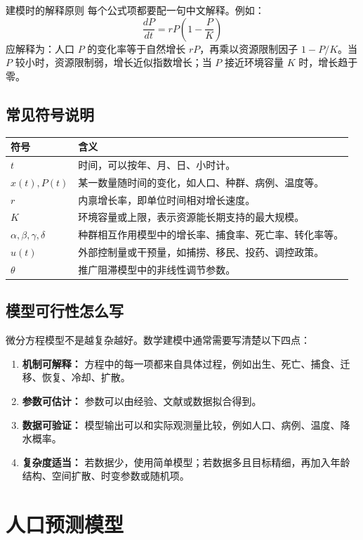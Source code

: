 \documentclass[11pt,a4paper]{ctexart}
\begin{document}
\begin{modelbox}{建模时的解释原则}
每个公式项都要配一句中文解释。例如：
\[
\frac{dP}{dt}=rP\left(1-\frac{P}{K}\right)
\]
应解释为：人口 $P$ 的变化率等于自然增长 $rP$，再乘以资源限制因子 $1-P/K$。当 $P$ 较小时，资源限制弱，增长近似指数增长；当 $P$ 接近环境容量 $K$ 时，增长趋于零。
\end{modelbox}

\subsection{常见符号说明}
\begin{longtable}{>{\centering\arraybackslash}p{2.3cm}p{10.5cm}}
\toprule
符号 & 含义 \\
\midrule
$t$ & 时间，可以按年、月、日、小时计。\\
$x(t),P(t)$ & 某一数量随时间的变化，如人口、种群、病例、温度等。\\
$r$ & 内禀增长率，即单位时间相对增长速度。\\
$K$ & 环境容量或上限，表示资源能长期支持的最大规模。\\
$\alpha,\beta,\gamma,\delta$ & 种群相互作用模型中的增长率、捕食率、死亡率、转化率等。\\
$u(t)$ & 外部控制量或干预量，如捕捞、移民、投药、调控政策。\\
$\theta$ & 推广阻滞模型中的非线性调节参数。\\
\bottomrule
\end{longtable}

\subsection{模型可行性怎么写}
微分方程模型不是越复杂越好。数学建模中通常需要写清楚以下四点：
\begin{enumerate}[itemsep=0.2em]
\item \textbf{机制可解释：} 方程中的每一项都来自具体过程，例如出生、死亡、捕食、迁移、恢复、冷却、扩散。
\item \textbf{参数可估计：} 参数可以由经验、文献或数据拟合得到。
\item \textbf{数据可验证：} 模型输出可以和实际观测量比较，例如人口、病例、温度、降水概率。
\item \textbf{复杂度适当：} 若数据少，使用简单模型；若数据多且目标精细，再加入年龄结构、空间扩散、时变参数或随机项。
\end{enumerate}

\section{人口预测模型}
\end{document}
